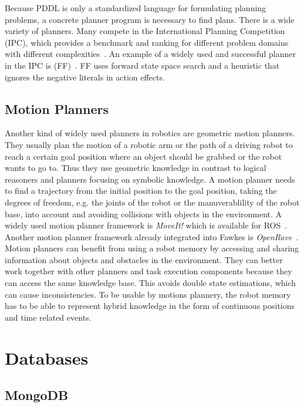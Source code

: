Because PDDL is only a standardized language for formulating planning
problems, a concrete planner program is necessary to find plans. There
is a wide variety of planners. Many compete in the International
Planning Competition (IPC), which provides a benchmark and ranking for
different problem domains with different
complexities~\cite{planning-competition}. An example of a widely used
and successful planner in the IPC is (FF)~\cite{hoffmannFF}. FF uses
forward state space search and a heuristic that ignores the negative
literals in action effects.

\subsection{Motion Planners}
Another kind of widely used planners in robotics are geometric motion
planners. They usually plan the motion of a robotic arm or the path of
a driving robot to reach a certain goal position where an object
should be grabbed or the robot wants to go to. Thus they use geometric
knowledge in contrast to logical reasoners and planners focusing on
symbolic knowledge.  A motion planner needs to find a trajectory from
the initial position to the goal position, taking the degrees of
freedom, e.g. the joints of the robot or the manuverablility of the
robot base, into account and avoiding collisions with objects in the
environment. A widely used motion planner framework is \emph{MoveIt!}
which is available for ROS~\cite{MoveIt}. Another motion planner
framework already integrated into Fawkes is
\emph{OpenRave}~\cite{OpenRave}.
Motion planners can benefit from using a robot memory by accessing and
sharing information about objects and obstacles in the environment.
They can better work together with other planners and task execution
components because they can access the same knowledge base. This
avoids double state estimations, which can cause inconsistencies. To
be usable by motions plannery, the robot memory has to be able to
represent hybrid knowledge in the form of continuous positions and
time related events.

\section{Databases}
\label{sec:databases}
\subsection{MongoDB}
\label{sec:mongodb}

